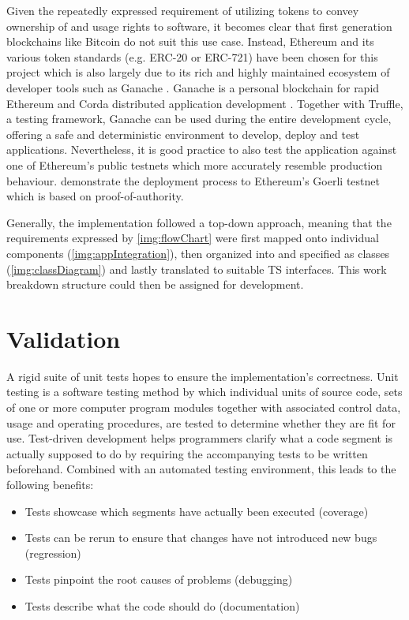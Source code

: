 \documentclass{egpubl}
\begin{document}
Given the repeatedly expressed requirement of utilizing tokens to convey ownership of and usage rights to software, it becomes clear that first generation blockchains like Bitcoin do not suit this use case. Instead, Ethereum and its various token standards (e.g. ERC-20 or ERC-721) have been chosen for this project which is also largely due to its rich and highly maintained ecosystem of developer tools such as Ganache \cite{lee2019testing}. Ganache is a personal blockchain for rapid Ethereum and Corda distributed application development \cite{brown2016corda}. Together with Truffle, a testing framework, Ganache can be used during the entire development cycle, offering a safe and deterministic environment to develop, deploy and test applications. Nevertheless, it is good practice to also test the application against one of Ethereum's public testnets which more accurately resemble production behaviour.  demonstrate the deployment process to Ethereum's Goerli testnet which is based on proof-of-authority.

Generally, the implementation followed a top-down approach, meaning that the requirements expressed by \autoref{img:flowChart} were first mapped onto individual components (\autoref{img:appIntegration}), then organized into and specified as classes (\autoref{img:classDiagram}) and lastly translated to suitable TS interfaces. This work breakdown structure could then be assigned for development.


\section{Validation}

A rigid suite of unit tests hopes to ensure the implementation's correctness. Unit testing is a software testing method by which individual units of source code, sets of one or more computer program modules together with associated control data, usage and operating procedures, are tested to determine whether they are fit for use. Test-driven development helps programmers clarify what a code segment is actually supposed to do by requiring the accompanying tests to be written beforehand. Combined with an automated testing environment, this leads to the following benefits:

\begin{itemize}
   \item Tests showcase which segments have actually been executed (coverage)
   \item Tests can be rerun to ensure that changes have not introduced new bugs (regression)
   \item Tests pinpoint the root causes of problems (debugging)
   \item Tests describe what the code should do (documentation)
\end{itemize}
\end{document}
